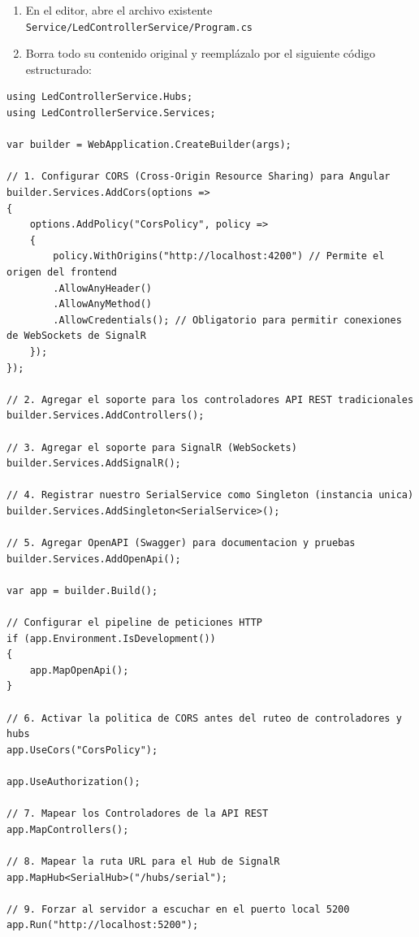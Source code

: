 \documentclass[
10pt, %
a4paper, %
oneside, %
headinclude,footinclude, %
BCOR5mm, %
]{scrartcl}
\begin{document}
\begin{enumerate}
	\item En el editor, abre el archivo existente \texttt{Service/LedControllerService/Program.cs}
	\item Borra todo su contenido original y reemplázalo por el siguiente código estructurado:
\end{enumerate}

\begin{lstlisting}[style=VSCodeDark]
using LedControllerService.Hubs;
using LedControllerService.Services;

var builder = WebApplication.CreateBuilder(args);

// 1. Configurar CORS (Cross-Origin Resource Sharing) para Angular
builder.Services.AddCors(options =>
{
	options.AddPolicy("CorsPolicy", policy =>
	{
		policy.WithOrigins("http://localhost:4200") // Permite el origen del frontend
		.AllowAnyHeader()
		.AllowAnyMethod()
		.AllowCredentials(); // Obligatorio para permitir conexiones de WebSockets de SignalR
	});
});

// 2. Agregar el soporte para los controladores API REST tradicionales
builder.Services.AddControllers();

// 3. Agregar el soporte para SignalR (WebSockets)
builder.Services.AddSignalR();

// 4. Registrar nuestro SerialService como Singleton (instancia unica)
builder.Services.AddSingleton<SerialService>();

// 5. Agregar OpenAPI (Swagger) para documentacion y pruebas
builder.Services.AddOpenApi();

var app = builder.Build();

// Configurar el pipeline de peticiones HTTP
if (app.Environment.IsDevelopment())
{
	app.MapOpenApi();
}

// 6. Activar la politica de CORS antes del ruteo de controladores y hubs
app.UseCors("CorsPolicy");

app.UseAuthorization();

// 7. Mapear los Controladores de la API REST
app.MapControllers();

// 8. Mapear la ruta URL para el Hub de SignalR
app.MapHub<SerialHub>("/hubs/serial");

// 9. Forzar al servidor a escuchar en el puerto local 5200
app.Run("http://localhost:5200");

\end{lstlisting}
\end{document}
